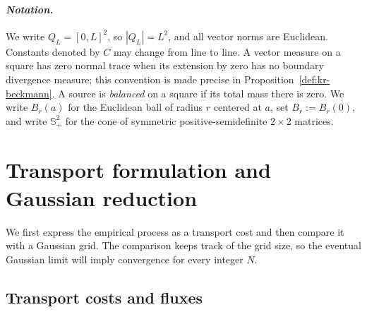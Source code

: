 \documentclass{smfart}
\theoremstyle{definition}
\newcommand{\1}{\mathbf 1}
\begin{document}
\smallskip
\paragraph{\textit{Notation.}}
We write \(Q_L=[0,L]^2\), so \(|Q_L|=L^2\), and all vector norms are
Euclidean.  Constants denoted by \(C\) may change from line to line.  A vector
measure on a square has zero normal trace when its extension by zero has no
boundary divergence measure; this convention is made precise in
Proposition~\ref{def:kr-beckmann}.  A source is \emph{balanced} on a square if
its total mass there is zero.  We write \(B_r(a)\) for the Euclidean ball of
radius \(r\) centered at \(a\), set \(B_r:=B_r(0)\), and write
\(\mathbb S_+^2\) for the cone of symmetric
positive-semidefinite \(2\times2\) matrices.

\section{Transport formulation and Gaussian reduction}\label{sec:transport}

We first express the empirical process as a transport cost and then compare
it with a Gaussian grid.  The comparison keeps track of the grid size, so
the eventual Gaussian limit will imply convergence for every integer $N$.

\subsection{Transport costs and fluxes}
\end{document}
